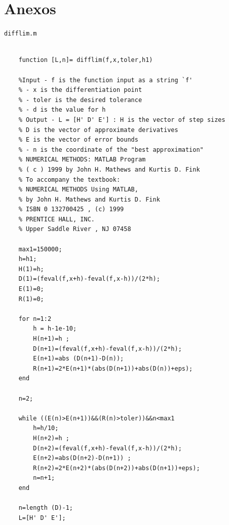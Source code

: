 \documentclass[english,notitlepage,letterpaper, 10pt]{article} %
\begin{document}
  \newpage

  \section{Anexos}

  \texttt{difflim.m}

  \begin{lstlisting}
  
    function [L,n]= difflim(f,x,toler,h1)

    %Input - f is the function input as a string `f'
    % - x is the differentiation point
    % - toler is the desired tolerance
    % - d is the value for h
    % Output - L = [H' D' E'] : H is the vector of step sizes
    % D is the vector of approximate derivatives
    % E is the vector of error bounds
    % - n is the coordinate of the "best approximation"
    % NUMERICAL METHODS: MATLAB Program
    % ( c ) 1999 by John H. Mathews and Kurtis D. Fink
    % To accompany the textbook:
    % NUMERICAL METHODS Using MATLAB,
    % by John H. Mathews and Kurtis D. Fink
    % ISBN 0 132700425 , (c) 1999
    % PRENTICE HALL, INC.
    % Upper Saddle River , NJ 07458
    
    max1=150000;
    h=h1;
    H(1)=h;
    D(1)=(feval(f,x+h)-feval(f,x-h))/(2*h);
    E(1)=0;
    R(1)=0;
    
    for n=1:2
        h = h-1e-10;
        H(n+1)=h ;
        D(n+1)=(feval(f,x+h)-feval(f,x-h))/(2*h);
        E(n+1)=abs (D(n+1)-D(n));
        R(n+1)=2*E(n+1)*(abs(D(n+1))+abs(D(n))+eps);
    end
    
    n=2;
    
    while ((E(n)>E(n+1))&&(R(n)>toler))&&n<max1
        h=h/10;
        H(n+2)=h ;
        D(n+2)=(feval(f,x+h)-feval(f,x-h))/(2*h);
        E(n+2)=abs(D(n+2)-D(n+1)) ;
        R(n+2)=2*E(n+2)*(abs(D(n+2))+abs(D(n+1))+eps);
        n=n+1;
    end
    
    n=length (D)-1;
    L=[H' D' E'];

  \end{lstlisting}

  
  
\end{document}

